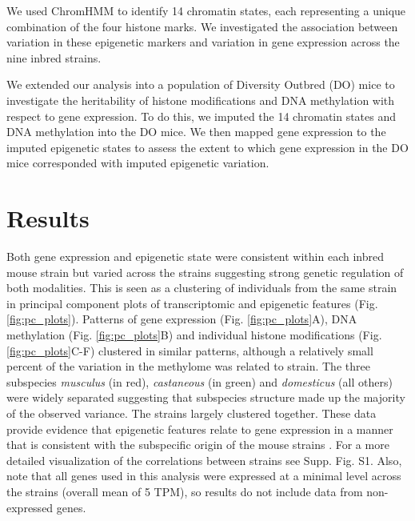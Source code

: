 \documentclass[
  11pt,
]{article}
\begin{document}
We used ChromHMM \citep{Ernst:2012ii} to identify 14 chromatin states,
each representing a unique combination of the four histone marks. We
investigated the association between variation in these epigenetic
markers and variation in gene expression across the nine inbred strains.

We extended our analysis into a population of Diversity Outbred (DO)
mice
\citep{churchill2012diversity, Svenson:2012hq, Gatti:2014ko, pmid27309819}
to investigate the heritability of histone modifications and DNA
methylation with respect to gene expression. To do this, we imputed the
14 chromatin states and DNA methylation into the DO mice. We then mapped
gene expression to the imputed epigenetic states to assess the extent to
which gene expression in the DO mice corresponded with imputed
epigenetic variation.

\hypertarget{results}{%
\section{Results}\label{results}}

Both gene expression and epigenetic state were consistent within each
inbred mouse strain but varied across the strains suggesting strong
genetic regulation of both modalities. This is seen as a clustering of
individuals from the same strain in principal component plots of
transcriptomic and epigenetic features (Fig. \ref{fig:pc_plots}).
Patterns of gene expression (Fig. \ref{fig:pc_plots}A), DNA methylation
(Fig. \ref{fig:pc_plots}B) and individual histone modifications (Fig.
\ref{fig:pc_plots}C-F) clustered in similar patterns, although a
relatively small percent of the variation in the methylome was related
to strain. The three subspecies \textit{musculus} (in red),
\textit{castaneous} (in green) and \textit{domesticus} (all others) were
widely separated suggesting that subspecies structure made up the
majority of the observed variance. The  strains largely
clustered together. These data provide evidence that epigenetic features
relate to gene expression in a manner that is consistent with the
subspecific origin of the mouse strains \citep{yang2007subspecific}. For
a more detailed visualization of the correlations between strains see
Supp. Fig. S1. Also, note that all genes used in this analysis were
expressed at a minimal level across the strains (overall mean of 5 TPM),
so results do not include data from non-expressed genes.
\end{document}
